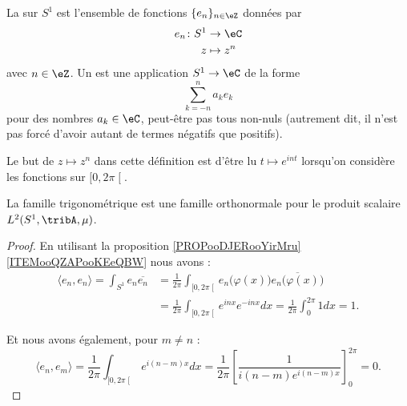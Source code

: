 \begin{definition}
	La  sur \( S^1\) est l'ensemble de fonctions \( \{ e_n \}_{n\in \eZ}\) données par
	\begin{equation}
		\begin{aligned}
			e_n\colon S^1 & \to \eC     \\
			z             & \mapsto z^n
		\end{aligned}
	\end{equation}
	avec \( n\in \eZ\). Un  est une application \( S^1\to \eC\) de la forme
	\begin{equation}
		\sum_{k=-n}^na_ke_k
	\end{equation}
	pour des nombres \( a_k\in \eC\), peut-être pas tous non-nuls (autrement dit, il n'est pas forcé d'avoir autant de termes négatifs que positifs).
\end{definition}
Le but de \( z\mapsto z^n\) dans cette définition est d'être lu \(  t\mapsto e^{in t}\) lorsqu'on considère les fonctions sur \( \mathopen[ 0 , 2\pi \mathclose[\).

\begin{proposition}     \label{PROPooOMGFooROFFFr}
	La famille trigonométrique est une famille orthonormale pour le produit scalaire \( L^2(S^1,\tribA,\mu)\).
\end{proposition}

\begin{proof}
	En utilisant la proposition \ref{PROPooDJERooYirMru}\ref{ITEMooQZAPooKEeQBW} nous avons :
	\begin{subequations}
		\begin{align}
			\langle e_n, e_n\rangle =\int_{S^1}e_n\overline{ e_n } & =\frac{1}{ 2\pi }\int_{\mathopen[ 0 , 2\pi \mathclose[}e_n\big( \varphi(x) \big)\overline{ e_n\big( \varphi(x) \big) } \\
			                                                       & =\frac{1}{ 2\pi }\int_{\mathopen[ 0 , 2\pi \mathclose[} e^{inx} e^{-inx}dx=\frac{1}{ 2\pi }\int_{0}^{2\pi}1dx=1.
		\end{align}
	\end{subequations}

	Et nous avons également, pour \( m\neq n\) :
	\begin{equation}
		\langle e_n, e_m\rangle =\frac{1}{ 2\pi }\int_{\mathopen[ 0 , 2\pi \mathclose[} e^{i(n-m)x}dx=\frac{1}{ 2\pi }\left[ \frac{1}{ i(n-m) e^{i(n-m)x} } \right]_0^{2\pi}=0.
	\end{equation}
\end{proof}

